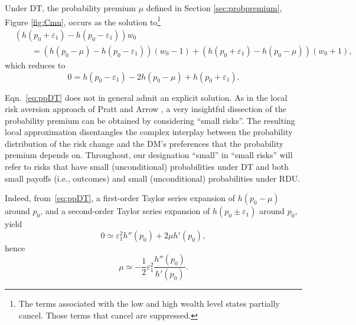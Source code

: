 \documentclass[11pt]{article}
\begin{document}
Under DT, the probability premium $\mu$
defined in Section \ref{sec:probpremium}, Figure \ref{fig:Cmu},
occurs as the solution to\footnote{The terms associated
with the low and high wealth level states 
partially cancel.
Those terms that cancel are suppressed.}
\begin{align*}
&\left(h(p_{0}+\varepsilon_{1})-h(p_{0}-\varepsilon_{1})\right)w_{0}\nonumber\\
&\qquad=\left(h(p_{0}-\mu)-h(p_{0}-\varepsilon_{1})\right)\left(w_{0}-1\right)
+\left(h(p_{0}+\varepsilon_{1})-h(p_{0}-\mu)\right)\left(w_{0}+1\right),
\end{align*}
which reduces to
\begin{equation}
0=h(p_{0}-\varepsilon_{1})-2h(p_{0}-\mu)+h(p_{0}+\varepsilon_{1}).
\label{eq:ppDT}
\end{equation}

Eqn.~\eqref{eq:ppDT} does not in general admit an explicit solution.
As in the local risk aversion approach of Pratt \cite{P64} and Arrow \cite{A65,A71},
a very insightful dissection of the probability premium
can be obtained by considering ``small risks''.
The resulting local approximation
disentangles the complex interplay between the probability distribution of the risk change
and the DM's preferences that the probability premium depends on.
Throughout, our designation ``small'' in ``small risks'' will refer to risks that have
small (unconditional) probabilities under DT
and both small payoffs (i.e., outcomes)
and small (unconditional) probabilities under RDU.

Indeed, from~\eqref{eq:ppDT}, a first-order Taylor series expansion of $h(p_{0}-\mu)$ around $p_{0}$,
and a second-order Taylor series expansion of $h(p_{0}\pm\varepsilon_{1})$ around $p_{0}$,
yield
\begin{equation*}
0\simeq\varepsilon_{1}^{2} h''(p_{0})+2\mu h'(p_{0}),
\end{equation*}
hence
\begin{equation}
\mu\simeq -\frac{1}{2}\varepsilon_{1}^{2}\frac{h''(p_{0})}{h'(p_{0})}.
\label{eq:ppDTapp}
\end{equation}
\end{document}
